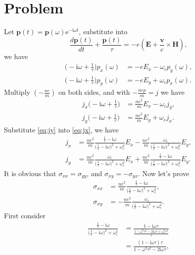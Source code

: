 \documentclass[12pt]{article}
\newcommand{\ii}{{\mathrm{i}}}
\newcommand{\ee}{\mathrm{e}}
\newcommand*{\RMN}[1]{\uppercase\expandafter{\romannumeral#1}}
\begin{document}
\section*{Problem \RMN{4}}
Let $\bm{p}(t) = \bm{p}(\omega) \ee^{-\ii \omega t}$, substitute into
\begin{equation}
	\frac{d\bm{p}(t)}{dt} + \frac{\bm{p}(t)}{\tau} = - e (\bm{E} + \frac{\bm{v}}{c }\times \bm{H}),
\end{equation}
we have
\begin{align}
	\Big(- \ii \omega + \frac{1}{\tau}\Big) p_x (\omega ) & = - e E_x -\omega_c p_y(\omega), \\
	\Big(- \ii \omega + \frac{1}{\tau}\Big) p_y (\omega ) & = - e E_y +\omega_c p_x(\omega).
\end{align}
Multiply $\left( -\frac{ne}{m}\right) $ on both sides, and with $-\frac{nep}{m}=j$ we have
\begin{align}
	j_x  \Big(- \ii \omega + \frac{1}{\tau}\Big) & = \frac{ne^2}{m} E_x - \omega_c j_y, \label{eq:jx} \\
	j_y  \Big(- \ii \omega + \frac{1}{\tau}\Big) & = \frac{ne^2}{m} E_y + \omega_c j_x. \label{eq:jy}
\end{align}
Substitute \eqref{eq:jy} into \eqref{eq:jx}, we have
\begin{align}
	j_x & = \frac{ne^2}{m} \frac{\frac{1}{\tau}-\ii \omega}{\big(\frac{1}{\tau} - \ii \omega\big)^2 + \omega_c^2 } E_x - \frac{ne^2}{m}\frac{\omega_c}{\big(\frac{1}{\tau} -\ii \omega\big)^2 + \omega_c^2 }E_y, \\
	j_y & = \frac{ne^2}{m} \frac{\omega_c}{\big(\frac{1}{\tau} -
	\ii\omega\big)^2 + \omega_c^2 }E_x + \frac{ne^2}{m} \frac{ \frac{
	1}{\tau}-\ii \omega}{\big(\frac{1}{\tau} - \ii \omega\big)^2 +
	\omega_c^2} E_y.
\end{align}
It is obvious that $\sigma_{xx} = \sigma_{yy}$, and $\sigma_{xy} = - \sigma_{yx}$.
Now let's prove
\begin{align}
	\sigma_{xx} & = \frac{ne^2}{m} \frac{\frac{1}{\tau}-\ii \omega}{\big(\frac{1}{\tau} - \ii \omega\big)^2 + \omega_c^2 }, \\
	\sigma_{xy} & =  - \frac{ne^2}{m}\frac{\omega_c}{\big(\frac{1}{\tau} -\ii \omega\big)^2 + \omega_c^2 }.
\end{align}
First consider
\begin{equation}
	\begin{split}
		\frac{\frac{1}{\tau}-\ii \omega}{\big(\frac{1}{\tau} - \ii \omega\big)^2 + \omega_c^2 } &= \frac{1- \ii \omega \tau}{\frac{1 - \omega^2\tau^2 - 2\ii \omega\tau + \omega_c^2\tau^2}{\tau}} \\
		&= \frac{(1 -\ii \omega\tau)\tau}{1- \omega^2\tau^2 - 2\ii \omega\tau},
	\end{split}
\end{equation}
\end{document}
